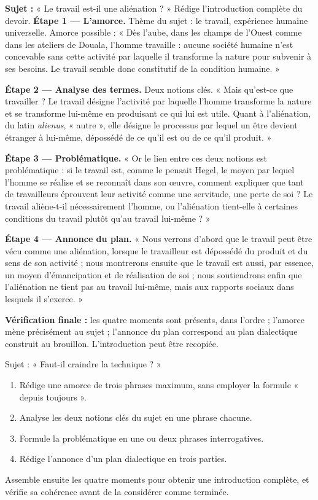 \documentclass[11pt]{article}
\begin{document}
\begin{exoresolu}
\textbf{Sujet :} « Le travail est-il une aliénation ? » Rédige l'introduction complète du devoir.
\tcblower
\textbf{Étape 1 — L'amorce.} Thème du sujet : le travail, expérience humaine universelle. Amorce possible : « Dès l'aube, dans les champs de l'Ouest comme dans les ateliers de Douala, l'homme travaille : aucune société humaine n'est concevable sans cette activité par laquelle il transforme la nature pour subvenir à ses besoins. Le travail semble donc constitutif de la condition humaine. »

\textbf{Étape 2 — Analyse des termes.} Deux notions clés. « Mais qu'est-ce que travailler ? Le travail désigne l'activité par laquelle l'homme transforme la nature et se transforme lui-même en produisant ce qui lui est utile. Quant à l'aliénation, du latin \emph{alienus}, « autre », elle désigne le processus par lequel un être devient étranger à lui-même, dépossédé de ce qu'il est ou de ce qu'il produit. »

\textbf{Étape 3 — Problématique.} « Or le lien entre ces deux notions est problématique : si le travail est, comme le pensait Hegel, le moyen par lequel l'homme se réalise et se reconnaît dans son œuvre, comment expliquer que tant de travailleurs éprouvent leur activité comme une servitude, une perte de soi ? Le travail aliène-t-il nécessairement l'homme, ou l'aliénation tient-elle à certaines conditions du travail plutôt qu'au travail lui-même ? »

\textbf{Étape 4 — Annonce du plan.} « Nous verrons d'abord que le travail peut être vécu comme une aliénation, lorsque le travailleur est dépossédé du produit et du sens de son activité ; nous montrerons ensuite que le travail est aussi, par essence, un moyen d'émancipation et de réalisation de soi ; nous soutiendrons enfin que l'aliénation ne tient pas au travail lui-même, mais aux rapports sociaux dans lesquels il s'exerce. »

\textbf{Vérification finale :} les quatre moments sont présents, dans l'ordre ; l'amorce mène précisément au sujet ; l'annonce du plan correspond au plan dialectique construit au brouillon. L'introduction peut être recopiée.
\end{exoresolu}

\begin{exercice}
Sujet : « Faut-il craindre la technique ? »
\begin{enumerate}
\item Rédige une amorce de trois phrases maximum, sans employer la formule « depuis toujours ».
\item Analyse les deux notions clés du sujet en une phrase chacune.
\item Formule la problématique en une ou deux phrases interrogatives.
\item Rédige l'annonce d'un plan dialectique en trois parties.
\end{enumerate}
Assemble ensuite les quatre moments pour obtenir une introduction complète, et vérifie sa cohérence avant de la considérer comme terminée.
\end{exercice}
\end{document}
